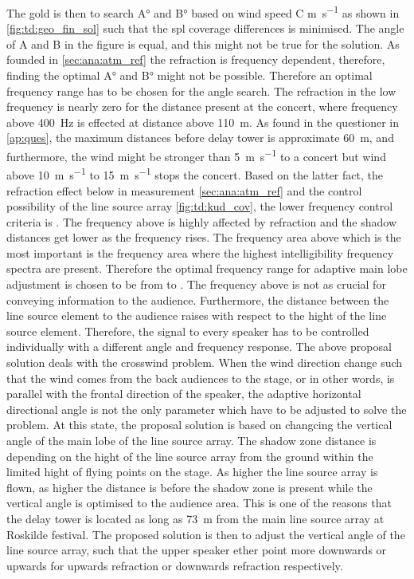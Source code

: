 The gold is then to search A\si{\degree} and B\si{\degree} based on wind speed C \si{\meter\per\second} as shown in \autoref{fig:td:geo_fin_sol} such that the \gls{spl} coverage differences is minimised. The angle of A and B in the figure is equal, and this might not be true for the solution. As founded in \autoref{sec:ana:atm_ref} the refraction is frequency dependent, therefore, finding the optimal  A\si{\degree} and B\si{\degree} might not be possible. Therefore an optimal frequency range has to be chosen for the angle search. The refraction in the low frequency is nearly zero for the distance present at the concert, where frequency above \SI{400}{\hertz} is effected at distance above \SI{110}{\meter}.  As found in the questioner in \autoref{ap:ques}, the maximum distances before delay tower is approximate \SI{60}{\meter}, and furthermore, the wind might be stronger than \SI{5}{\meter\per\second} to a concert but wind above \SI{10}{\meter\per\second} to \SI{15}{\meter\per\second} stops the concert. Based on the latter fact, the refraction effect below  in measurement \autoref{sec:ana:atm_ref} and the control possibility of the line source array \autoref{fig:td:kud_cov}, the lower frequency control criteria is . The frequency above  is highly affected by refraction and the shadow distances get lower as the frequency rises. 
The frequency area above  which is the most important is the frequency area where the highest intelligibility frequency spectra are present. Therefore the optimal frequency range for adaptive main lobe adjustment is chosen to be from  to . The frequency above is not as crucial for conveying information to the audience. Furthermore, the distance between the line source element to the audience raises with respect to the hight of the line source element. Therefore, the signal to every speaker has to be controlled individually with a different angle and frequency response. The above proposal solution deals with the crosswind problem. When the wind direction change such that the wind comes from the back audiences to the stage, or in other words, is parallel with the frontal direction of the speaker, the adaptive horizontal directional angle is not the only parameter which have to be adjusted to solve the problem. At this state, the proposal solution is based on changcing the vertical angle of the main lobe of the line source array. The shadow zone distance is depending on the hight of the line source array from the ground within the limited hight of flying points on the stage. As higher the line source array is flown, as higher the distance is before the shadow zone is present while the vertical angle is optimised to the audience area. This is one of the reasons that the delay tower is located as long as \SI{73}{\meter} from the main line source array at Roskilde festival. The proposed solution is then to adjust the vertical angle of the line source array, such that the upper speaker ether point more downwards or upwards for upwards refraction or downwards refraction respectively. 
